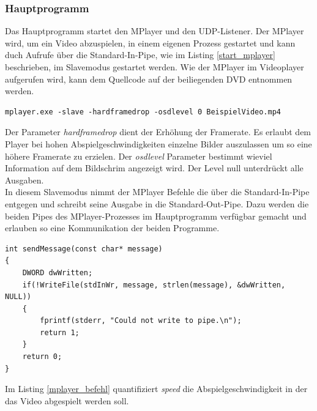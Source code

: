 \subsubsection{Hauptprogramm}
Das Hauptprogramm startet den MPlayer und den UDP-Listener. Der MPlayer wird, um ein Video abzuspielen, in einem eigenen Prozess gestartet und kann duch Aufrufe über die Standard-In-Pipe, wie im Listing \ref{start_mplayer} beschrieben, im Slavemodus gestartet werden. Wie der MPlayer im Videoplayer aufgerufen wird, kann dem Quellcode auf der beiliegenden DVD entnommen werden. 
\begin{lstlisting}[caption={Starten des MPlayers in einem eigenen Prozess}, label={start_mplayer}]
mplayer.exe -slave -hardframedrop -osdlevel 0 BeispielVideo.mp4
\end{lstlisting}
Der Parameter \textit{hardframedrop} dient der Erhöhung der Framerate. Es erlaubt dem Player bei hohen Abspielgeschwindigkeiten einzelne Bilder auszulassen um so eine höhere Framerate zu erzielen. Der \textit{osdlevel} Parameter bestimmt wieviel Information auf dem Bildschrim angezeigt wird. Der Level null unterdrückt alle Ausgaben.\\
In diesem Slavemodus nimmt der MPlayer Befehle die über die Standard-In-Pipe entgegen und schreibt seine Ausgabe in die Standard-Out-Pipe. Dazu werden die beiden Pipes des MPlayer-Prozesses im Hauptprogramm verfügbar gemacht und erlauben so eine Kommunikation der beiden Programme. 
\begin{lstlisting}[caption={Funktion zum Senden von Nachrichten an MPlayer}, label={mplayer_befehl}]
int sendMessage(const char* message)
{
	DWORD dwWritten;
	if(!WriteFile(stdInWr, message, strlen(message), &dwWritten, NULL))
	{
		fprintf(stderr, "Could not write to pipe.\n");
		return 1;
	}
	return 0;
}
\end{lstlisting}
Im Listing \ref{mplayer_befehl} quantifiziert \textit{speed} die Abspielgeschwindigkeit in der das Video abgespielt werden soll. 